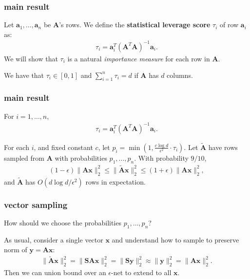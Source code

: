 \documentclass[compress]{beamer}
\newcommand{\bv}[1]{\mathbf{#1}}
\begin{document}
\begin{frame}[t]
	\frametitle{main result}
	Let $\bv{a}_1, \ldots, \bv{a}_n$ be $\bv{A}$'s rows. We define the \alert{\textbf{statistical leverage score}} $\tau_i$ of row $\bv{a}_i$ as:
	\begin{align*}
		\tau_i = \bv{a}_i^T(\bv{A}^T\bv{A})^{-1}\bv{a}_i.
	\end{align*}	
We will show that $\tau_i$ is a natural \emph{importance measure} for each row in $\bv{A}$.

We have that $\tau_i \in [0,1]$ and $\sum_{i=1}^n \tau_i = d$ if $\bv{A}$ has $d$ columns. 


\end{frame}

\begin{frame}[t]
	\frametitle{main result}
	For $i = 1, \ldots, n$,
	\begin{align*}
		\tau_i = \bv{a}_i^T(\bv{A}^T\bv{A})^{-1}\bv{a}_i.
	\end{align*}	
	\begin{theorem}
		For each $i$, and fixed constant $c$, let $p_i = \min\left(1,\frac{c\log d}{\epsilon^2}\cdot \tau_i\right)$.
		Let ${\tilde{\bv{A}}}$ have rows sampled from $\bv{A}$ with probabilities $p_1, \ldots, p_n$. With probability $9/10$, 
		\begin{align*}
			(1-\epsilon)\|\bv{A}\bv{x}\|_2^2 \leq \|\tilde{\bv{A}} \bv{x}\|_2^2 \leq	(1+\epsilon)\|\bv{A}\bv{x}\|_2^2,
		\end{align*}
		and ${\tilde{\bv{A}}}$ has $O(d\log d/\epsilon^2)$ rows in expectation. 
	\end{theorem}
\end{frame}


\begin{frame}[t]
	\frametitle{vector sampling}
	\begin{center}
		How should we choose the probabilities $p_1, \ldots, p_n$?
	\end{center}
	As usual, consider a single vector $\bv{x}$ and understand how to sample to preserve norm of $\bv{y} = \bv{A}\bv{x}$:
	\begin{align*}
		\|\tilde{\bv{A}}\bv{x}\|_2^2 = \|\bv{S}{\bv{A}}\bv{x}\|_2^2 = \|\bv{S}\bv{y}\|_2^2 \approx \|\bv{y}\|_2^2 = \|\bv{Ax}\|_2^2. 
	\end{align*}
	Then we can union bound over an $\epsilon$-net to extend to all $\bv{x}$. 
\end{frame}
\end{document}
